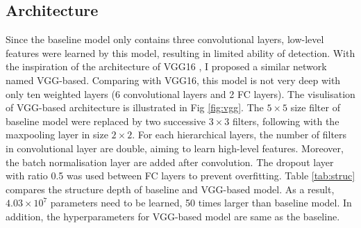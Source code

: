 \subsection{Architecture}
Since the baseline model only contains three convolutional layers, low-level features were learned by this model, resulting in limited ability of detection. With the inspiration of the architecture of VGG16 \cite{simonyan2014very}, I proposed a similar network named VGG-based. Comparing with VGG16, this model is not very deep with only ten weighted layers (6 convolutional layers and 2 FC layers). The visulisation of VGG-based architecture is illustrated in Fig \ref{fig:vgg}. The $5\times5$ size filter of baseline model were replaced by two successive $3\times3$ filters, following with the maxpooling layer in size $2\times2$. For each hierarchical layers, the number of filters in convolutional layer are double, aiming to learn high-level features. Moreover, the batch normalisation layer are added after convolution. The dropout layer with ratio 0.5 was used between FC layers to prevent overfitting. Table \ref{tab:struc} compares the structure depth of baseline and VGG-based model. As a result, $4.03\times10^{7}$ parameters need to be learned, 50 times larger than baseline model. In addition, the hyperparameters for VGG-based model are same as the baseline.
\begin{table}[htp]
\centering
\caption{Comparing depth of models}
\label{tab:struc}
\end{table}
